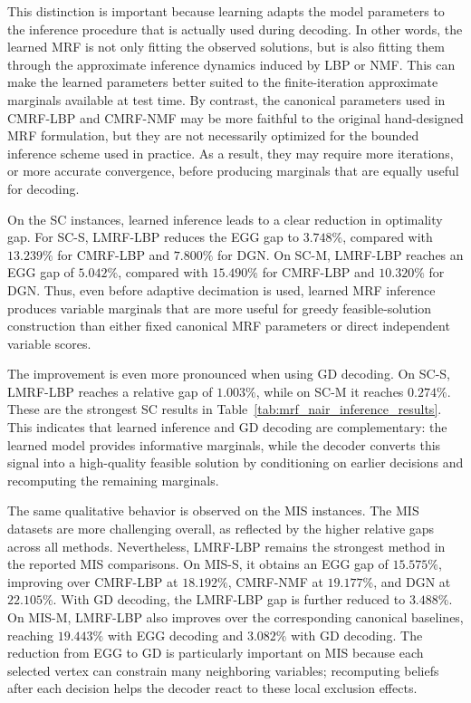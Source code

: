This distinction is important because learning adapts the model parameters to the inference procedure that is actually used during decoding. In other words, the learned MRF is not only fitting the observed solutions, but is also fitting them through the approximate inference dynamics induced by LBP or NMF. This can make the learned parameters better suited to the finite-iteration approximate marginals available at test time. By contrast, the canonical parameters used in CMRF-LBP and CMRF-NMF may be more faithful to the original hand-designed MRF formulation, but they are not necessarily optimized for the bounded inference scheme used in practice. As a result, they may require more iterations, or more accurate convergence, before producing marginals that are equally useful for decoding.



On the SC instances, learned inference leads to a clear reduction in optimality gap. For SC-S, LMRF-LBP reduces the EGG gap to $3.748\%$, compared with $13.239\%$ for CMRF-LBP and $7.800\%$ for DGN. On SC-M, LMRF-LBP reaches an EGG gap of $5.042\%$, compared with $15.490\%$ for CMRF-LBP and $10.320\%$ for DGN. Thus, even before adaptive decimation is used, learned MRF inference produces variable marginals that are more useful for greedy feasible-solution construction than either fixed canonical MRF parameters or direct independent variable scores.

The improvement is even more pronounced when using GD decoding. On SC-S, LMRF-LBP reaches a relative gap of $1.003\%$, while on SC-M it reaches $0.274\%$. These are the strongest SC results in Table~\ref{tab:mrf_nair_inference_results}. This indicates that learned inference and GD decoding are complementary: the learned model provides informative marginals, while the decoder converts this signal into a high-quality feasible solution by conditioning on earlier decisions and recomputing the remaining marginals.



The same qualitative behavior is observed on the MIS instances. The MIS datasets are more challenging overall, as reflected by the higher relative gaps across all methods. Nevertheless, LMRF-LBP remains the strongest method in the reported MIS comparisons. On MIS-S, it obtains an EGG gap of $15.575\%$, improving over CMRF-LBP at $18.192\%$, CMRF-NMF at $19.177\%$, and DGN at $22.105\%$. With GD decoding, the LMRF-LBP gap is further reduced to $3.488\%$. On MIS-M, LMRF-LBP also improves over the corresponding canonical baselines, reaching $19.443\%$ with EGG decoding and $3.082\%$ with GD decoding. The reduction from EGG to GD is particularly important on MIS because each selected vertex can constrain many neighboring variables; recomputing beliefs after each decision helps the decoder react to these local exclusion effects.

